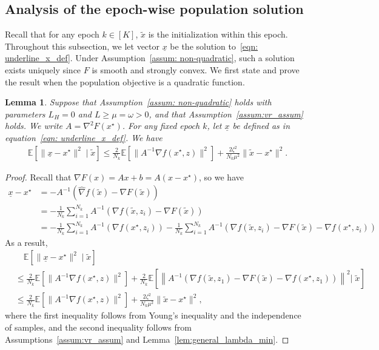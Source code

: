 \documentclass[11pt,twoside]{article}
\numberwithin{equation}{section}
\newcommand{\EE}{\mathbb{E}}
\newcommand{\1}{\mathbf{1}}
\newtheorem{lemma}[theorem]{Lemma}
\theoremstyle{remark}
\theoremstyle{plain}
\newcommand{\liph}{L_H}
\newcommand{\lmin}{\omega}
\begin{document}
\subsection{Analysis of the epoch-wise population solution}\label{subsec:epoch_solution}
Recall that for any epoch $k \in [K]$, $\tilde x$ is the initialization within this epoch. Throughout this subsection, we let vector $\underline{x}$ be the solution to~\eqref{eqn: underline_x_def}.
Under Assumption~\ref{assum: non-quadratic}, such a solution exists uniquely since $F$ is smooth and strongly convex.  We first state and prove the result when the population objective is a quadratic function. 	\begin{lemma}\label{lem:vr_quadratic_key}
Suppose that  Assumption~\ref{assum: non-quadratic} holds with parameters  $\liph = 0$ and  $L \ge \mu = \lmin >0$,   and that Assumption~\ref{assum:vr_assum} holds. We write $A = \nabla^2 F(x^\star)$. For any fixed epoch $k$, let $\underline{x}$ be defined as in equation~\eqref{eqn: underline_x_def}. We have
\begin{align}\label{eqn:vr_quadratic_key}
\EE[\|\underline{x} - x^\star\|^2 \mid \tilde x] \le \frac{2}{N_k}\EE[\|A^{-1}\nabla f(x^\star,z)\|^2]+ \frac{2 \zeta^2}{N_k \mu^2 } \|\tilde x - x^\star\|^2.
\end{align}
\end{lemma}	
\begin{proof}
Recall that $\nabla F(x) = Ax +b = A(x-x^\star)$, so we have
\begin{align*}
\underline{x} -x^\star &= - A^{-1} (\widehat{\nabla} f(\tilde x) - \nabla F(\tilde x))\\
&= - \frac{1}{N_k}\sum_{i=1}^{N_k}A^{-1}(\nabla f(\tilde x, z_i ) - \nabla F(\tilde x) )\\
&= -\frac{1}{N_k}\sum_{i=1}^{N_k}A^{-1}(\nabla f(x^\star,z_i)) -    \frac{1}{N_k}\sum_{i=1}^{N_k} A^{-1}(\nabla f(\tilde x, z_i ) - \nabla F(\tilde x) - \nabla f(x^\star,z_i))
\end{align*}
As a result,
\begin{align*}
&\quad \EE[\|\underline{x} - x^\star\|^2\mid \tilde x]\\
&\le  \frac{2}{N_k} \EE[\|A^{-1}\nabla f(x^\star,z) \|^2] + \frac{2}{N_k}\EE\left[\left\| A^{-1}(\nabla f(\tilde x, z_1 ) - \nabla F(\tilde x) - \nabla f(x^\star,z_1))\right\|^2 \big| \;\tilde x\right]\\
&\le \frac{2}{N_k} \EE[\|A^{-1}\nabla f(x^\star,z) \|^2] + \frac{2 \zeta^2}{ N_k \mu^2} \|\tilde x  -x^\star\|^2,
\end{align*}
where the first inequality follows from Young's inequality and  the independence of samples, and the second inequality follows from Assumptions~\ref{assum:vr_assum} and Lemma~\ref{lem:general_lambda_min}.
\end{proof}
\end{document}
